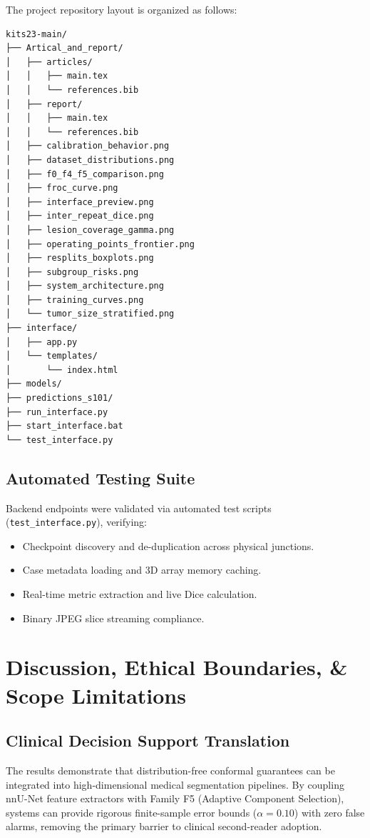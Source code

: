 \documentclass[11pt,a4paper]{report}
\begin{document}
The project repository layout is organized as follows:
\begin{verbatim}
kits23-main/
├── Artical_and_report/
│   ├── articles/
│   │   ├── main.tex
│   │   └── references.bib
│   ├── report/
│   │   ├── main.tex
│   │   └── references.bib
│   ├── calibration_behavior.png
│   ├── dataset_distributions.png
│   ├── f0_f4_f5_comparison.png
│   ├── froc_curve.png
│   ├── interface_preview.png
│   ├── inter_repeat_dice.png
│   ├── lesion_coverage_gamma.png
│   ├── operating_points_frontier.png
│   ├── resplits_boxplots.png
│   ├── subgroup_risks.png
│   ├── system_architecture.png
│   ├── training_curves.png
│   └── tumor_size_stratified.png
├── interface/
│   ├── app.py
│   └── templates/
│       └── index.html
├── models/
├── predictions_s101/
├── run_interface.py
├── start_interface.bat
└── test_interface.py
\end{verbatim}

\section{Automated Testing Suite}
Backend endpoints were validated via automated test scripts (\texttt{test\_interface.py}), verifying:
\begin{itemize}
    \item Checkpoint discovery and de-duplication across physical junctions.
    \item Case metadata loading and 3D array memory caching.
    \item Real-time metric extraction and live Dice calculation.
    \item Binary JPEG slice streaming compliance.
\end{itemize}

\chapter{Discussion, Ethical Boundaries, \& Scope Limitations}

\section{Clinical Decision Support Translation}
The results demonstrate that distribution-free conformal guarantees can be integrated into high-dimensional medical segmentation pipelines. By coupling nnU-Net feature extractors with Family F5 (Adaptive Component Selection), systems can provide rigorous finite-sample error bounds ($\alpha = 0.10$) with zero false alarms, removing the primary barrier to clinical second-reader adoption.
\end{document}
